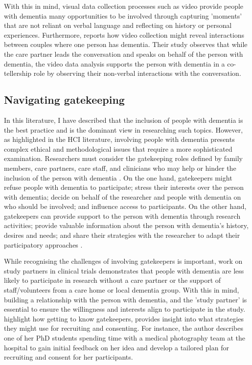 With this in mind, visual data collection processes such as video provide people with dementia many opportunities to be involved through capturing 'moments' that are not reliant on verbal language and reflecting on history or personal experiences. Furthermore, \cite{majlesi2017video} reports how video collection might reveal interactions between couples where one person has dementia. Their study observes that while the care partner leads the conversation and speaks on behalf of the person with dementia, the video data analysis supports the person with dementia in a co-tellership role by observing their non-verbal interactions with the conversation.

\subsection{Navigating gatekeeping}
\label{BL:EthicalDilemmas}
In this literature, I have described that the inclusion of people with dementia is the best practice and is the dominant view in researching such topics. However, as highlighted in the HCI literature, involving people with dementia presents complex ethical and methodological issues that require a more sophisticated examination. Researchers must consider the gatekeeping roles defined by family members, care partners, care staff, and clinicians who may help or hinder the inclusion of the person with dementia \citep{ries2020ethical}. On the one hand, gatekeepers might refuse people with dementia to participate; stress their interests over the person with dementia; decide on behalf of the researcher and people with dementia on who should be involved; and influence access to participants. On the other hand, gatekeepers can provide support to the person with dementia through research activities; provide valuable information about the person with dementia's history, desires and needs; and share their strategies with the researcher to adapt their participatory approaches \citep{novek2019safe}.

While recognising the challenges of involving gatekeepers is important, \cite{grill2014facilitating} work on study partners in clinical trials demonstrates that people with dementia are less likely to participate in research without a care partner or the support of staff/volunteers from a care home or local dementia group. With this in mind, building a relationship with the person with dementia, and the 'study partner' is essential to ensure the willingness and interests align to participate in the study. \cite{bartlett2019strategies} highlight how getting to know gatekeepers, provides insight into what strategies they might use for recruiting and consenting. For instance, the author describes one of her PhD students spending time with a medical photography team at the hospital to gain initial feedback on her idea and develop a tailored plan for recruiting and consent for her participants. 


